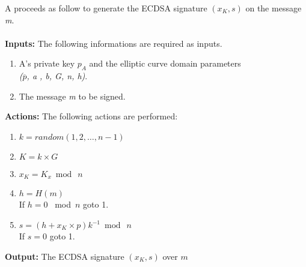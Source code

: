 A proceeds as follow to generate the ECDSA signature $(x_{K}, s)$ on the message \textit{m}.\\
\\
\textbf{Inputs:} The following informations are required as inputs.

\hspace{1.1cm}
\begin{minipage}[l]{2\linewidth}
	\begin{enumerate}
		\item A's private key  \textit{$p_{A}$} and the elliptic curve domain parameters\\ \textit{($\overline{p}$, a , b, G, n, h)}.
		\item The message \textit{m} to be signed.\\
	\end{enumerate}
\end{minipage}


\textbf{Actions:} The following actions are performed:

\hspace{1.2cm}
\begin{minipage}[l]{2\linewidth}
	\begin{enumerate}
		\item $\textit{k}=random({1, 2, \dots, n-1})$
		\item $K=k \times G$
		\item $x_{K}=K_{x} \bmod\ n$
		\item $h=H(m)$\\
		If $h=0$ \ mod\ $n$ goto 1.
		\item $s=(h+x_{K}\times p)k^{-1}\bmod\ n$ \\
		If $s=0$ goto 1.
	\end{enumerate}
\end{minipage}

\textbf{Output:} The ECDSA signature $(x_{K}, s)$ over $m$


